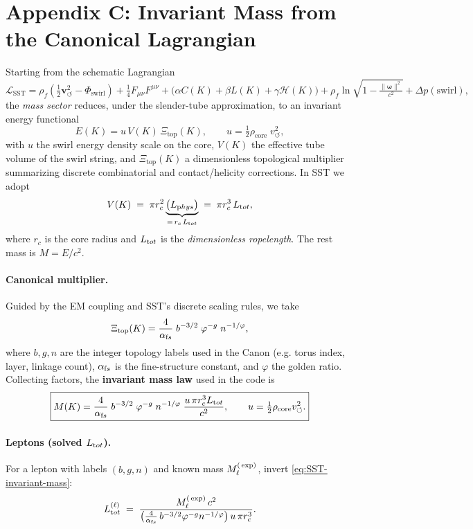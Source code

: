 \documentclass[10pt,reprint,aps,onecolumn,nofootinbib]{revtex4-2}
\newcommand{\vswirl}{\mathbf{v}_{\!\boldsymbol{\circlearrowleft}}}
\newcommand{\rhof}{\rho_{\!f}}                           %
\begin{document}
    \section*{Appendix C: Invariant Mass from the Canonical Lagrangian}

    Starting from the schematic Lagrangian
    \[
        \mathcal{L}_{\text{SST}}
        = \rhof\!\left(\tfrac{1}{2}\vswirl^2 - \Phi_{\text{swirl}}\right)
        + \tfrac{1}{4}F_{\mu\nu}F^{\mu\nu}
        + \big(\alpha C(K)+\beta L(K)+\gamma \mathcal{H}(K)\big)
        + \rhof \ln\!\sqrt{1-\tfrac{\|\boldsymbol\omega\|^2}{c^2}}
        + \Delta p(\text{swirl}),
    \]
    the \emph{mass sector} reduces, under the slender-tube approximation, to an invariant energy functional
    \[
        E(K)= u\,V(K)\,\Xi_{\text{top}}(K),\qquad
        u=\tfrac{1}{2}\rho_{\text{core}}\;v_{\circlearrowleft}^{2},
    \]
    with $u$ the swirl energy density scale on the core, $V(K)$ the effective tube volume of the swirl string, and $\Xi_{\text{top}}(K)$ a dimensionless topological multiplier summarizing discrete combinatorial and contact/helicity corrections. In SST we adopt
    \[
        V(K)\;=\;\pi r_c^2 \underbrace{\big(L_{\textrm phys}\big)}_{=\,r_c\,L_{\textrm tot}}
        \;=\;\pi r_c^3\,L_{\textrm tot},
    \]
    where $r_c$ is the core radius and $L_{\textrm tot}$ is the \emph{dimensionless ropelength}. The rest mass is $M=E/c^2$.

    \paragraph{Canonical multiplier.}
        Guided by the EM coupling and SST’s discrete scaling rules, we take
        \[
            \Xi_{\text{top}}(K)=\frac{4}{\alpha_{\textrm fs}}\;b^{-3/2}\;\varphi^{-g}\;n^{-1/\varphi},
        \]
        where $b,g,n$ are the integer topology labels used in the Canon (e.g. torus index, layer, linkage count), $\alpha_{\textrm fs}$ is the fine-structure constant, and $\varphi$ the golden ratio. Collecting factors, the \textbf{invariant mass law} used in the code is
        \begin{equation*}
        \boxed{M(K)=\frac{4}{\alpha_{\textrm fs}}\;b^{-3/2}\;\varphi^{-g}\;n^{-1/\varphi}\;
        \frac{u\,\pi r_c^3 L_{\textrm tot}}{c^2},
            \qquad
            u=\tfrac{1}{2}\rho_{\text{core}}v_{\circlearrowleft}^2.
        }\label{eq:SST-invariant-mass}
        \end{equation*}

    \paragraph{Leptons (solved $L_{\textrm tot}$).}
        For a lepton with labels $(b,g,n)$ and known mass $M_\ell^{\textrm(\exp)}$, invert \eqref{eq:SST-invariant-mass}:
        \[
            L_{\textrm tot}^{(\ell)} \;=\;
            \frac{M_\ell^{\textrm(\exp)}\,c^2}{\big(\tfrac{4}{\alpha_{\textrm fs}}\,b^{-3/2}\varphi^{-g}n^{-1/\varphi}\big)\,u\,\pi r_c^3}.
        \]
\end{document}
